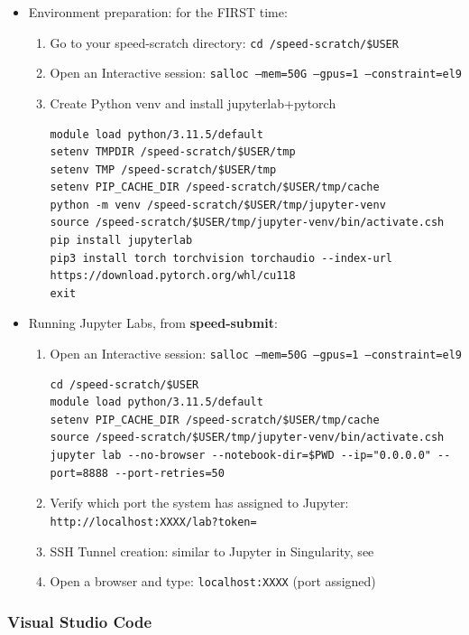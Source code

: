 \begin{itemize}
\item
Environment preparation: for the FIRST time:
\begin{enumerate}
\item
Go to your speed-scratch directory: \texttt{cd /speed-scratch/\$USER}
\item
Open an Interactive session: \texttt{salloc --mem=50G --gpus=1 --constraint=el9}
\item
Create Python venv and install jupyterlab+pytorch
\small
\begin{verbatim}
module load python/3.11.5/default
setenv TMPDIR /speed-scratch/$USER/tmp
setenv TMP /speed-scratch/$USER/tmp
setenv PIP_CACHE_DIR /speed-scratch/$USER/tmp/cache
python -m venv /speed-scratch/$USER/tmp/jupyter-venv
source /speed-scratch/$USER/tmp/jupyter-venv/bin/activate.csh
pip install jupyterlab
pip3 install torch torchvision torchaudio --index-url https://download.pytorch.org/whl/cu118
exit
\end{verbatim}
\normalsize
\end{enumerate}
\item
Running Jupyter Labs, from \textbf{speed-submit}:
\begin{enumerate}
\item
Open an Interactive session: \texttt{salloc --mem=50G --gpus=1 --constraint=el9} 
\scriptsize
\begin{verbatim}
cd /speed-scratch/$USER
module load python/3.11.5/default
setenv PIP_CACHE_DIR /speed-scratch/$USER/tmp/cache
source /speed-scratch/$USER/tmp/jupyter-venv/bin/activate.csh
jupyter lab --no-browser --notebook-dir=$PWD --ip="0.0.0.0" --port=8888 --port-retries=50
\end{verbatim}
\normalsize
\item
Verify which port the system has assigned to Jupyter: 
\texttt{http://localhost:XXXX/lab?token=}
\item
SSH Tunnel creation: similar to Jupyter in Singularity, see 
\item
Open a browser and type: \texttt {localhost:XXXX} (port assigned)
\end{enumerate}
\end{itemize}


\subsubsection{Visual Studio Code}
\label{sect:vscode}

